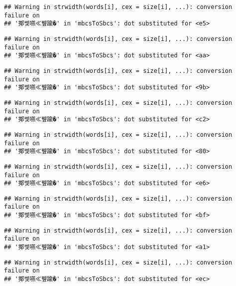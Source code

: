 \documentclass[]{article}
\begin{document}
\begin{verbatim}
## Warning in strwidth(words[i], cex = size[i], ...): conversion failure on
## '揶쎛嚥≪뮆踰�' in 'mbcsToSbcs': dot substituted for <e5>
\end{verbatim}

\begin{verbatim}
## Warning in strwidth(words[i], cex = size[i], ...): conversion failure on
## '揶쎛嚥≪뮆踰�' in 'mbcsToSbcs': dot substituted for <aa>
\end{verbatim}

\begin{verbatim}
## Warning in strwidth(words[i], cex = size[i], ...): conversion failure on
## '揶쎛嚥≪뮆踰�' in 'mbcsToSbcs': dot substituted for <9b>
\end{verbatim}

\begin{verbatim}
## Warning in strwidth(words[i], cex = size[i], ...): conversion failure on
## '揶쎛嚥≪뮆踰�' in 'mbcsToSbcs': dot substituted for <c2>
\end{verbatim}

\begin{verbatim}
## Warning in strwidth(words[i], cex = size[i], ...): conversion failure on
## '揶쎛嚥≪뮆踰�' in 'mbcsToSbcs': dot substituted for <80>
\end{verbatim}

\begin{verbatim}
## Warning in strwidth(words[i], cex = size[i], ...): conversion failure on
## '揶쎛嚥≪뮆踰�' in 'mbcsToSbcs': dot substituted for <e6>
\end{verbatim}

\begin{verbatim}
## Warning in strwidth(words[i], cex = size[i], ...): conversion failure on
## '揶쎛嚥≪뮆踰�' in 'mbcsToSbcs': dot substituted for <bf>
\end{verbatim}

\begin{verbatim}
## Warning in strwidth(words[i], cex = size[i], ...): conversion failure on
## '揶쎛嚥≪뮆踰�' in 'mbcsToSbcs': dot substituted for <a1>
\end{verbatim}

\begin{verbatim}
## Warning in strwidth(words[i], cex = size[i], ...): conversion failure on
## '揶쎛嚥≪뮆踰�' in 'mbcsToSbcs': dot substituted for <ec>
\end{verbatim}
\end{document}
